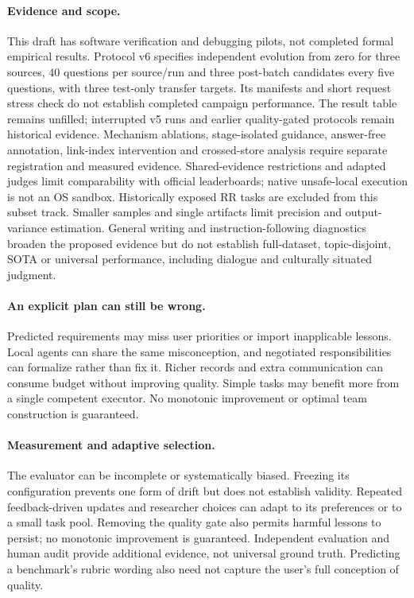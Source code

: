 \documentclass[11pt]{article}
\begin{document}
\paragraph{Evidence and scope.}
This draft has software verification and debugging pilots, not completed formal empirical results. Protocol v6 specifies independent evolution from zero for three sources, 40 questions per source/run and three post-batch candidates every five questions, with three test-only transfer targets. Its manifests and short request stress check do not establish completed campaign performance. The result table remains unfilled; interrupted v5 runs and earlier quality-gated protocols remain historical evidence. Mechanism ablations, stage-isolated guidance, answer-free annotation, link-index intervention and crossed-store analysis require separate registration and measured evidence. Shared-evidence restrictions and adapted judges limit comparability with official leaderboards; native unsafe-local execution is not an OS sandbox. Historically exposed RR tasks are excluded from this subset track. Smaller samples and single artifacts limit precision and output-variance estimation. General writing and instruction-following diagnostics broaden the proposed evidence but do not establish full-dataset, topic-disjoint, SOTA or universal performance, including dialogue and culturally situated judgment.

\paragraph{An explicit plan can still be wrong.}
Predicted requirements may miss user priorities or import inapplicable lessons. Local agents can share the same misconception, and negotiated responsibilities can formalize rather than fix it. Richer records and extra communication can consume budget without improving quality. Simple tasks may benefit more from a single competent executor. No monotonic improvement or optimal team construction is guaranteed.

\paragraph{Measurement and adaptive selection.}
The evaluator can be incomplete or systematically biased. Freezing its configuration prevents one form of drift but does not establish validity. Repeated feedback-driven updates and researcher choices can adapt to its preferences or to a small task pool. Removing the quality gate also permits harmful lessons to persist; no monotonic improvement is guaranteed. Independent evaluation and human audit provide additional evidence, not universal ground truth. Predicting a benchmark's rubric wording also need not capture the user's full conception of quality.
\end{document}
